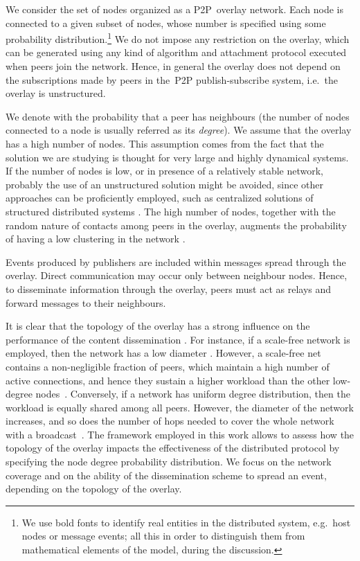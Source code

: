 \documentclass[10pt, conference, compsocconf]{IEEEtran}
\begin{document}
We consider the set of nodes organized as a \ac{P2P}~overlay network. Each node  is connected to a given subset of nodes, 
whose number is specified using some probability distribution.\footnote{We use bold fonts to identify real entities in the distributed system, e.g.~host nodes or message events; all this in order to distinguish them from mathematical elements of the model, during the discussion.} We do not impose any restriction on the overlay, which can be generated using any kind of algorithm and attachment protocol executed when peers join the network. 
Hence, in general the overlay does not depend on the subscriptions made by peers in the~\ac{P2P} publish-subscribe system, i.e.~the overlay is unstructured.

We denote with  the probability that a peer  has  neighbours (the number of nodes connected to a node  is usually referred as its \emph{degree}). 
We assume that the overlay has a high number of nodes. This assumption comes from the fact that the solution we are studying is thought for very large and highly dynamical systems. If the number of nodes is low, or in presence of a relatively stable network, probably the use of an unstructured solution might be avoided, since other approaches can be proficiently employed, such as centralized solutions of structured distributed systems \cite{Ahullo:2008,Baldoni:2005,Eugster:2003}.
The high number of nodes, together with the random nature of contacts among peers in the overlay, augments the probability of having a low clustering in the network \cite{newmanHandbook}.

Events produced by publishers are included within messages spread through the overlay.
Direct communication may occur only between neighbour nodes. Hence, to disseminate information through the overlay, peers must act as relays and forward messages to their neighbours. 

It is clear that the topology of the overlay has a strong influence on the performance of the content dissemination \cite{disio11}. 
For instance, if a scale-free network is employed, then the network has a low diameter 
\cite{newman03thestructure}. 
However, a scale-free net contains a non-negligible fraction of peers, which maintain a high number of active connections, and hence they sustain a higher workload than the other low-degree nodes~\cite{Barabasi2000,guclu}. 
Conversely, if a network has uniform degree distribution, then the workload is equally shared among all peers. However, the diameter of the network increases, and so does the number of hops needed to
cover the whole network with a broadcast~\cite{gridpeer}. 
The framework employed in this work allows to assess how the topology of the overlay impacts the effectiveness of the distributed protocol by specifying the node degree probability distribution.
We focus on the network coverage and on the ability of the dissemination scheme to spread an event, depending on the topology of the overlay.
\end{document}
